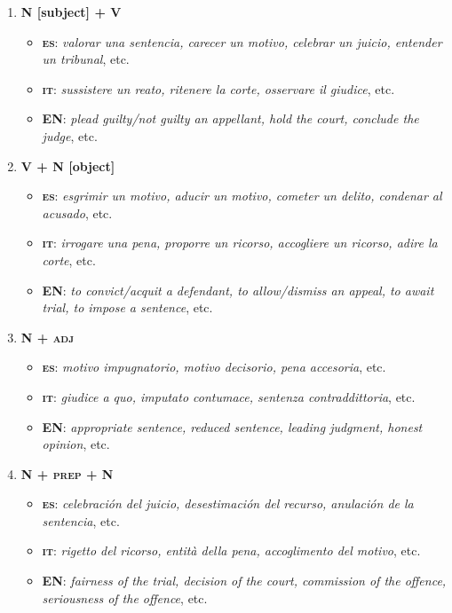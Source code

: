 \documentclass[output=paper]{LSP/langsci}
\begin{document}
\begin{enumerate}
\item\textbf{ N [subject] + V}
\begin{itemize}
\item \textbf{\textsc{es}}: \textit{valorar una sentencia, carecer un motivo, celebrar un juicio, entender un tribunal}, etc.
\item \textbf{\textsc{it}}: \textit{sussistere un reato, ritenere la corte, osservare il giudice}, etc.
\item \textbf{EN}: \textit{plead guilty/not guilty an appellant, hold the court, conclude the judge}, etc.
\end{itemize}
\item \textbf{V + N [object]}
\begin{itemize}
\item \textbf{\textsc{es}}: \textit{esgrimir un motivo, aducir un motivo, cometer un delito, condenar al acusado}, etc.
\item \textbf{\textsc{it}}: \textit{irrogare una pena, proporre un ricorso, accogliere un ricorso, adire la corte}, etc.
\item \textbf{EN}: \textit{to convict/acquit a defendant, to allow/dismiss an appeal, to await trial, to impose a sentence}, etc.
\end{itemize}
\item \textbf{N + \textsc{adj}}
\begin{itemize}
\item \textbf{\textsc{es}}: \textit{motivo impugnatorio, motivo decisorio, pena accesoria}, etc.
\item \textbf{\textsc{it}}: \textit{giudice a quo, imputato contumace, sentenza contraddittoria}, etc.
\item \textbf{EN}: \textit{appropriate sentence, reduced sentence, leading judgment, honest opinion}, etc.
\end{itemize}
\item \textbf{N + \textsc{prep} + N}
\begin{itemize}
\item \textbf{\textsc{es}}: \textit{celebración del juicio, desestimación del recurso, anulación de la sentencia}, etc.
\item \textbf{\textsc{it}}: \textit{rigetto del ricorso, entità della pena, accoglimento del motivo}, etc.
\item \textbf{EN}: \textit{fairness of the trial, decision of the court, commission of the offence, seriousness of the offence}, etc.
\end{itemize}
\end{enumerate}
\end{document}
